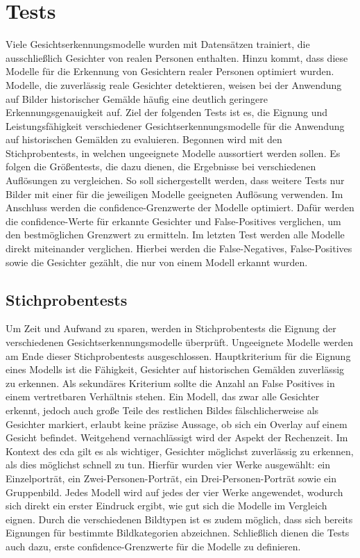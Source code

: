 \chapter{Tests}
Viele Gesichtserkennungsmodelle wurden mit Datensätzen trainiert, die ausschließlich Gesichter von realen Personen enthalten. Hinzu kommt, dass diese Modelle für die Erkennung von Gesichtern realer Personen optimiert wurden. Modelle, die zuverlässig reale Gesichter detektieren, weisen bei der Anwendung auf Bilder historischer Gemälde häufig eine deutlich geringere Erkennungsgenauigkeit auf. Ziel der folgenden Tests ist es, die Eignung und Leistungsfähigkeit verschiedener Gesichtserkennungsmodelle für die Anwendung auf historischen Gemälden zu evaluieren. Begonnen wird mit den Stichprobentests, in welchen ungeeignete Modelle aussortiert werden sollen. Es folgen die Größentests, die dazu dienen, die Ergebnisse bei verschiedenen Auflösungen zu vergleichen. So soll sichergestellt werden, dass weitere Tests nur Bilder mit einer für die jeweiligen Modelle geeigneten Auflösung verwenden. Im Anschluss werden die \gls{confidence}-Grenzwerte der Modelle optimiert. Dafür werden die \gls{confidence}-Werte für erkannte Gesichter und False-Positives verglichen, um den bestmöglichen Grenzwert zu ermitteln. Im letzten Test werden alle Modelle direkt miteinander verglichen. Hierbei werden die False-Negatives, False-Positives sowie die Gesichter gezählt, die nur von einem Modell erkannt wurden.


\section{Stichprobentests}
Um Zeit und Aufwand zu sparen, werden in Stichprobentests die Eignung der verschiedenen Gesichtserkennungsmodelle überprüft. Ungeeignete Modelle werden am Ende dieser Stichprobentests ausgeschlossen. Hauptkriterium für die Eignung eines Modells ist die Fähigkeit, Gesichter auf historischen Gemälden zuverlässig zu erkennen. Als sekundäres Kriterium sollte die Anzahl an False Positives in einem vertretbaren Verhältnis stehen. Ein Modell, das zwar alle Gesichter erkennt, jedoch auch große Teile des restlichen Bildes fälschlicherweise als Gesichter markiert, erlaubt keine präzise Aussage, ob sich ein Overlay auf einem Gesicht befindet. Weitgehend vernachlässigt wird der Aspekt der Rechenzeit. Im Kontext des \gls{cda} gilt es als wichtiger, Gesichter möglichst zuverlässig zu erkennen, als dies möglichst schnell zu tun. Hierfür wurden vier Werke ausgewählt: ein Einzelporträt, ein Zwei-Personen-Porträt, ein Drei-Personen-Porträt sowie ein Gruppenbild. Jedes Modell wird auf jedes der vier Werke angewendet, wodurch sich direkt ein erster Eindruck ergibt, wie gut sich die Modelle im Vergleich eignen. Durch die verschiedenen Bildtypen ist es zudem möglich, dass sich bereits Eignungen für bestimmte Bildkategorien abzeichnen. Schließlich dienen die Tests auch dazu, erste \gls{confidence}-Grenzwerte für die Modelle zu definieren.


